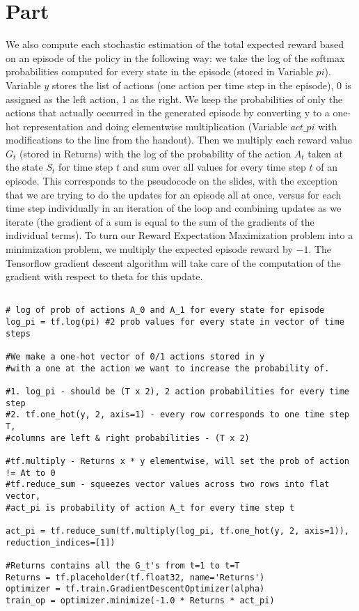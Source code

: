\documentclass{article}
\newcommand{\enterProblemHeader}[1]{
}
\newcommand{\exitProblemHeader}[1]{
}
\newcounter{homeworkProblemCounter} %
\newcommand{\homeworkProblemName}{}
\newenvironment{homeworkProblem}[1][Part \arabic{homeworkProblemCounter}]{ %
\stepcounter{homeworkProblemCounter} %
\renewcommand{\homeworkProblemName}{#1} %
\section{\homeworkProblemName} %
\enterProblemHeader{\homeworkProblemName} %
}{
\exitProblemHeader{\homeworkProblemName} %
}
\begin{document}
\begin{homeworkProblem}
\begin{enumerate}
We also compute each stochastic estimation of the total expected reward based on an episode of the policy in the following way: we take the log of the softmax probabilities computed for every state in the episode (stored in Variable $pi$). Variable $y$ stores the list of actions (one action per time step in the episode), 0 is assigned as the left action, 1 as the right. We keep the probabilities of only the actions that actually occurred in the generated episode by converting y to a one-hot representation and doing elementwise multiplication (Variable $act\_pi$ with modifications to the line from the handout). Then we multiply each reward value $G_{t}$ (stored in Returns) with the log of the probability of the action $A_{t}$ taken at the state $S_{t}$ for time step $t$ and sum over all values for every time step $t$ of an episode. This corresponds to the pseudocode on the slides, with the exception that we are trying to do the updates for an episode all at once, versus for each time step individually in an iteration of the loop and combining updates as we iterate (the gradient of a sum is equal to the sum of the gradients of the individual terms). To turn our Reward Expectation Maximization problem into a minimization problem, we multiply the expected episode reward by $-1$. The Tensorflow gradient descent algorithm will take care of the computation of the gradient with respect to theta for this update.    \\ 

\begin{lstlisting}

# log of prob of actions A_0 and A_1 for every state for episode
log_pi = tf.log(pi) #2 prob values for every state in vector of time steps 

#We make a one-hot vector of 0/1 actions stored in y
#with a one at the action we want to increase the probability of.

#1. log_pi - should be (T x 2), 2 action probabilities for every time step
#2. tf.one_hot(y, 2, axis=1) - every row corresponds to one time step T, 
#columns are left & right probabilities - (T x 2)

#tf.multiply - Returns x * y elementwise, will set the prob of action != At to 0
#tf.reduce_sum - squeezes vector values across two rows into flat vector,
#act_pi is probability of action A_t for every time step t

act_pi = tf.reduce_sum(tf.multiply(log_pi, tf.one_hot(y, 2, axis=1)),
reduction_indices=[1])

#Returns contains all the G_t's from t=1 to t=T  
Returns = tf.placeholder(tf.float32, name='Returns')
optimizer = tf.train.GradientDescentOptimizer(alpha)
train_op = optimizer.minimize(-1.0 * Returns * act_pi)


\end{lstlisting}
\end{enumerate}
\end{homeworkProblem}
\end{document}
